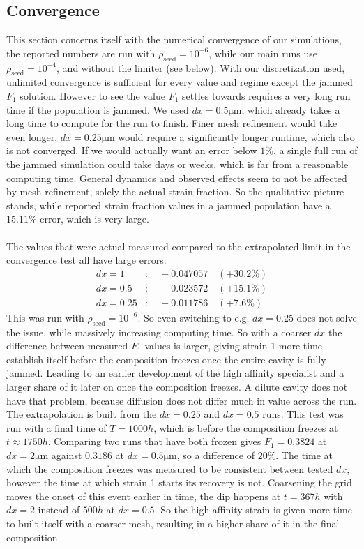 \documentclass[11pt,a4paper]{report}
\begin{document}
	\subsection{Convergence}
	\label{convergence}
	This section concerns itself with the numerical convergence of our simulations, the reported numbers are run with $\rho_{\mathrm{seed}}=10^{-6}$, while our main runs use $\rho_{\mathrm{seed}}=10^{-4}$, and without the limiter (see below). With our discretization used, unlimited convergence is sufficient for every value and regime except the jammed $F_1$ solution. However to see the value $F_1$ settles towards requires a very long run time if the population is jammed. We used $dx=0.5 \mathrm{\mu m}$, which already takes a long time to compute for the run to finish. Finer mesh refinement would take even longer, $dx=0.25\mathrm{\mu m}$ would require a significantly longer runtime, which also is not converged. If we would actually want an error below $1\%$, a single full run of the jammed simulation could take days or weeks, which is far from a reasonable computing time. General dynamics and observed effects seem to not be affected by mesh refinement, solely the actual strain fraction. So the qualitative picture stands, while reported strain fraction values in a jammed population have a $15.11 \%$ error, which is very large.\\
	\\
	The values that were actual measured compared to the extrapolated limit in the convergence test all have large errors:
	$$
	\begin{aligned}
		dx = 1 &: \quad +0.047057 \quad (+30.2\%) \\
		dx = 0.5 &: \quad +0.023572 \quad (+15.1\%) \\
		dx = 0.25 &: \quad +0.011786 \quad (+7.6\%)
	\end{aligned}
	$$
	This was run with $\rho_{\mathrm{seed}}=10^{-6}$. So even switching to e.g. $dx=0.25$ does not solve the issue, while massively increasing computing time. So with a coarser $dx$ the difference between measured $F_1$ values is larger, giving strain 1 more time establish itself before the composition freezes once the entire cavity is fully jammed. Leading to an earlier development of the high affinity specialist and a larger share of it later on once the composition freezes. A dilute cavity does not have that problem, because diffusion does not differ much in value across the run. The extrapolation is built from the $dx=0.25$ and $dx=0.5$ runs. This test was run with a final time of $T=1000h$, which is before the composition freezes at $t\approx 1750h$. Comparing two runs that have both frozen gives $F_1=0.3824$ at $dx=2\mathrm{\mu m}$ against $0.3186$ at $dx=0.5\mathrm{\mu m}$, so a difference of $20\%$. The time at which the composition freezes was measured to be consistent between tested $dx$, however the time at which strain 1 starts its recovery is not. Coarsening the grid moves the onset of this event earlier in time, the dip happens at $t=367h$ with $dx=2$ instead of $500h$ at $dx=0.5$. So the high affinity strain is given more time to built itself with a coarser mesh, resulting in a higher share of it in the final composition.
\end{document}
